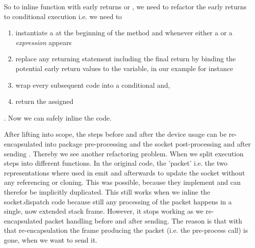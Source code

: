  So to inline function with early returns or , we need to refactor the early returns to conditional execution i.e. we need to 
 \begin{enumerate}
     \item instantiate a  at the beginning of the method and whenever either a  or a \emph{expression} appears
     \item replace any returning statement including the final return by binding the potential early return values to the  variable, in our example for instance 
     \item wrap every subsequent code into a conditional and, 
     \item return the assigned 
 \end{enumerate}
. 
Now we can safely inline the code. \\

After lifting  into scope, the steps before and after the device usage can be re-encapsulated into package pre-processing  and the socket post-processing and after sending . Thereby we see another refactoring problem. When we split execution steps into different functions. In the original code, the 'packet' i.e. the two representations where used in emit and afterwards to update the socket without any referencing or cloning. This was possible, because they implement  and can therefor be implicitly duplicated. This still works when we inline the socket.dispatch code because still any processing of the packet happens in a single, now extended stack frame. However, it stops working as we re-encapsulated packet handling before and after sending. The reason is that with that re-encapsulation the frame producing the packet (i.e. the pre-process call) is gone, when we want to send it. \\

